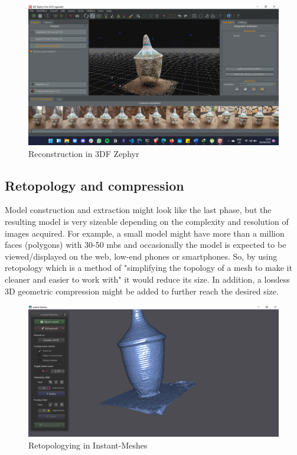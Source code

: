 \documentclass[conference]{IEEEtran}
\begin{document}
\begin{figure}[!h]
    \centering
    \includegraphics[width=\linewidth]{images/3df.png}
    \caption{Reconstruction in 3DF Zephyr}
    \label{fig:one}
\end{figure}

\subsection{Retopology and compression}
Model construction and extraction might look like the last phase, but the resulting model is very sizeable depending on the complexity and resolution of images acquired. For example, a small model might have more than a million faces (polygons) with 30-50 mbs \cite{Lauria2022} and occasionally the model is expected to be viewed/displayed on the web, low-end phones or smartphones. So, by using retopology which is a method of "simplifying the topology of a mesh to make it cleaner and easier to work with" \cite{reto} it would reduce its size. In addition, a lossless 3D geometric compression \cite{draco} might be added to further reach the desired size.

\begin{figure}[!h]
    \centering
    \includegraphics[width=\linewidth]{images/IM.png}
    \caption{Retopologying in Instant-Meshes}
    \label{fig:two}
\end{figure}
\end{document}
